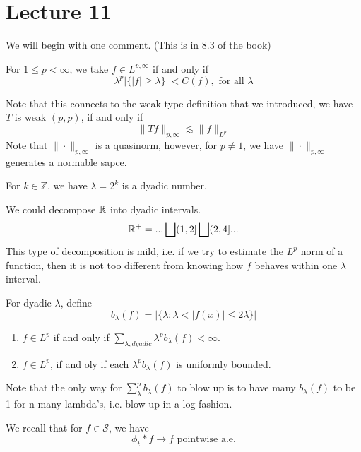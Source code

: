 \section{Lecture 11}
We will begin with one comment. (This is in 8.3 of the book)
\begin{definition}
    For $1\leq p<\infty$, we take $f\in L^{p,\infty}$ if and only if
    \begin{equation*}
        \lambda^p|\{|f|\geq\lambda\}|<C(f), \text{ for all } \lambda
    \end{equation*}
\end{definition}
Note that this connects to the weak type definition that we introduced,
we have $T$ is weak $(p,p)$, if and only if 
\begin{equation*}
    \|Tf\|_{p,\infty}\lesssim \|f\|_{L^p}
\end{equation*}
Note that $\|\cdot\|_{p,\infty}$ is a quasinorm, however, for $p\neq 1$, we have $\|\cdot\|_{p,\infty}$ generates a normable sapce.

\begin{definition}
    For $k\in\mathbb{Z}$, we have $\lambda=2^k$ is a dyadic number.
\end{definition}
We could decompose $\mathbb{R}$ into dyadic intervals.
\begin{equation*}
    \mathbb{R}^+=...\bigsqcup (1,2]\bigsqcup (2,4]...
\end{equation*}
This type of decomposition is mild, i.e. if we try to estimate the $L^p$ norm of a function, then it is not too different from knowing how $f$ behaves within one $\lambda$ interval.

\begin{definition}
    For dyadic $\lambda$, define
    \begin{equation*}
        b_\lambda(f)=|\{\lambda: \lambda<|f(x)|\leq 2\lambda\}|
    \end{equation*}
\end{definition}
\begin{exercise}
    \begin{enumerate}
        \item $f\in L^p$ if and only if $\sum_{\lambda, dyadic}\lambda^pb_\lambda(f)<\infty$.
        \item $f\in L^p$, if and oly if each $\lambda^pb_\lambda(f)$ is uniformly bounded.
    \end{enumerate}
\end{exercise}
\begin{remark}
    Note that the only way for $\sum_\lambda^p b_\lambda(f)$ to blow up is to have many $b_\lambda(f)$ to be 1 for n many lambda's, i.e. blow up in a log fashion.
\end{remark}
We recall that for $f\in\mathcal{S}$, we have
\begin{equation*}
    \phi_t\ast f\to f \text{ pointwise a.e.}
\end{equation*}

